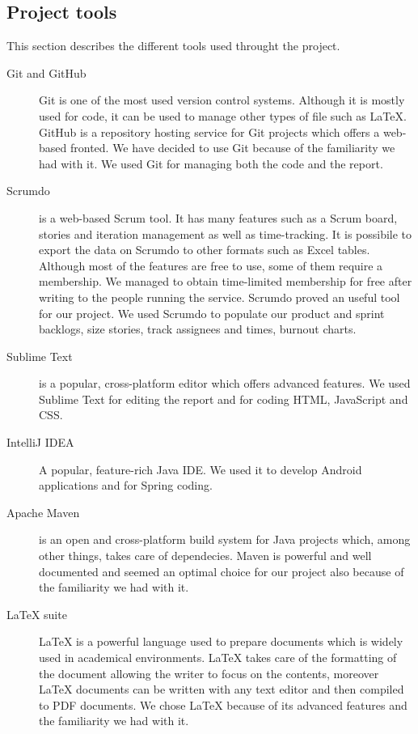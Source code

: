 
\subsection{Project tools}
\label{section:tools}
This section describes the different tools used throught the project.

\begin{description}

\item[Git and GitHub]
Git is one of the most used version control systems. Although it is mostly used for code, it can be used to manage other types of file such as LaTeX. GitHub is a repository hosting service for Git projects which offers a web-based fronted. We have decided to use Git because of the familiarity we had with it. We used Git for managing both the code and the report.

\item[Scrumdo]
is a web-based Scrum tool. It has many features such as a Scrum board, stories and iteration management
as well as time-tracking. It is possibile to export the data on Scrumdo to other formats such as Excel tables.
Although most of the features are free to use, some of them require a membership. We managed to obtain
time-limited membership for free after writing to the people running the service. Scrumdo proved an useful tool
for our project. We used Scrumdo to populate our product and sprint backlogs, size stories, track assignees
and times, burnout charts.

\item[Sublime Text]
is a popular, cross-platform editor which offers advanced features.
We used Sublime Text for editing the report and for coding HTML, JavaScript and CSS.

\item[IntelliJ IDEA]
A popular, feature-rich Java IDE. We used it to develop Android applications and for Spring coding.

\item[Apache Maven]
is an open and cross-platform build system for Java projects which, among other things, takes care of dependecies.
Maven is powerful and well documented and seemed an optimal choice for our project also because of the familiarity
we had with it.

\item[LaTeX suite]
LaTeX is a powerful language used to prepare documents which is widely used in academical environments.
LaTeX takes care of the formatting of the document allowing the writer to focus on the contents, moreover
LaTeX documents can be written with any text editor and then compiled to PDF documents. We chose LaTeX because
of its advanced features and the familiarity we had with it.


\end{description}
